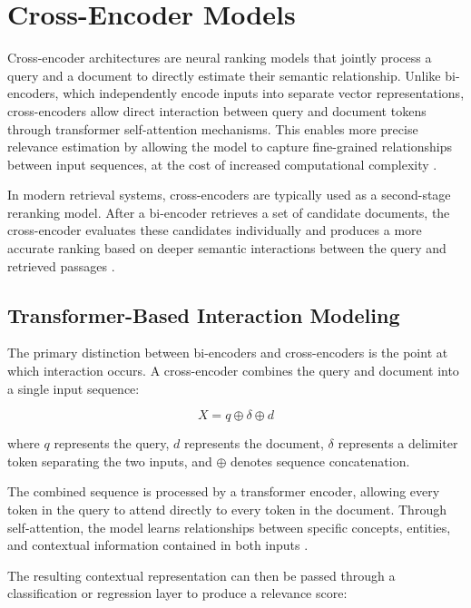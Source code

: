 \section{Cross-Encoder Models}

Cross-encoder architectures are neural ranking models that jointly process a query and a document to directly estimate their semantic relationship. Unlike bi-encoders, which independently encode inputs into separate vector representations, cross-encoders allow direct interaction between query and document tokens through transformer self-attention mechanisms. This enables more precise relevance estimation by allowing the model to capture fine-grained relationships between input sequences, at the cost of increased computational complexity \cite{nogueira2019passage, nogueira2020document}.

In modern retrieval systems, cross-encoders are typically used as a second-stage reranking model. After a bi-encoder retrieves a set of candidate documents, the cross-encoder evaluates these candidates individually and produces a more accurate ranking based on deeper semantic interactions between the query and retrieved passages \cite{nogueira2019passage, karpukhin2020dense}.

\subsection{Transformer-Based Interaction Modeling}

The primary distinction between bi-encoders and cross-encoders is the point at which interaction occurs. A cross-encoder combines the query and document into a single input sequence:

\begin{equation}
X = q \oplus \delta \oplus d
\end{equation}

where $q$ represents the query, $d$ represents the document, $\delta$ represents a delimiter token separating the two inputs, and $\oplus$ denotes sequence concatenation.

The combined sequence is processed by a transformer encoder, allowing every token in the query to attend directly to every token in the document. Through self-attention, the model learns relationships between specific concepts, entities, and contextual information contained in both inputs \cite{vaswani2017attention, devlin2019bert}.

The resulting contextual representation can then be passed through a classification or regression layer to produce a relevance score:

